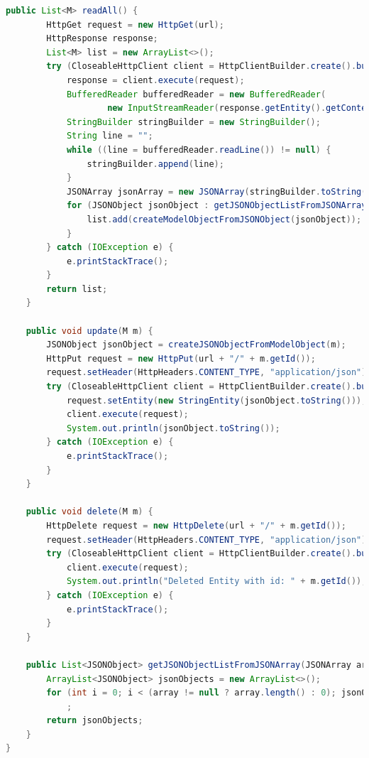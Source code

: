 \documentclass[11pt]{scrartcl}
\begin{document}
\begin{lstlisting}[language=java]
    public List<M> readAll() {
        HttpGet request = new HttpGet(url);
        HttpResponse response;
        List<M> list = new ArrayList<>();
        try (CloseableHttpClient client = HttpClientBuilder.create().build()) {
            response = client.execute(request);
            BufferedReader bufferedReader = new BufferedReader(
                    new InputStreamReader(response.getEntity().getContent()));
            StringBuilder stringBuilder = new StringBuilder();
            String line = "";
            while ((line = bufferedReader.readLine()) != null) {
                stringBuilder.append(line);
            }
            JSONArray jsonArray = new JSONArray(stringBuilder.toString());
            for (JSONObject jsonObject : getJSONObjectListFromJSONArray(jsonArray)) {
                list.add(createModelObjectFromJSONObject(jsonObject));
            }
        } catch (IOException e) {
            e.printStackTrace();
        }
        return list;
    }

    public void update(M m) {
        JSONObject jsonObject = createJSONObjectFromModelObject(m);
        HttpPut request = new HttpPut(url + "/" + m.getId());
        request.setHeader(HttpHeaders.CONTENT_TYPE, "application/json");
        try (CloseableHttpClient client = HttpClientBuilder.create().build()) {
            request.setEntity(new StringEntity(jsonObject.toString()));
            client.execute(request);
            System.out.println(jsonObject.toString());
        } catch (IOException e) {
            e.printStackTrace();
        }
    }

    public void delete(M m) {
        HttpDelete request = new HttpDelete(url + "/" + m.getId());
        request.setHeader(HttpHeaders.CONTENT_TYPE, "application/json");
        try (CloseableHttpClient client = HttpClientBuilder.create().build()) {
            client.execute(request);
            System.out.println("Deleted Entity with id: " + m.getId());
        } catch (IOException e) {
            e.printStackTrace();
        }
    }

    public List<JSONObject> getJSONObjectListFromJSONArray(JSONArray array) throws JSONException {
        ArrayList<JSONObject> jsonObjects = new ArrayList<>();
        for (int i = 0; i < (array != null ? array.length() : 0); jsonObjects.add(array.getJSONObject(i++)))
            ;
        return jsonObjects;
    }
}
\end{lstlisting}
\end{document}
